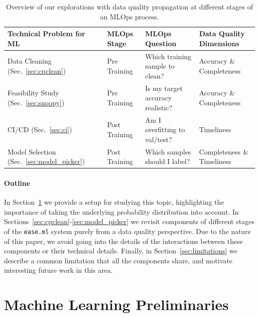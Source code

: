 \documentclass[11pt]{article}
\begin{document}
\begin{table}[t!]
\caption{Overview of 
our explorations with data quality propagation at different stages of an MLOps 
process.}
\label{tbl:overview}
\vspace{-0.5em}
\small
\centering
\begin{tabular}{@{}llll@{}}
\toprule
\textbf{Technical Problem for ML}                           & \textbf{MLOps Stage}         & \textbf{MLOps Question}                                   & \textbf{Data Quality Dimensions}        \\ \midrule
Data Cleaning (Sec.~\ref{sec:cpclean})~\cite{karlavs2020nearest}              & Pre Training  & Which training sample 
to clean?              &
Accuracy \& Completeness\\
Feasibility Study (Sec.~\ref{sec:snoopy})~\cite{renggli2020automatic}         & Pre Training  & Is my target accuracy realistic? & Accuracy \& Completeness\\
CI/CD (Sec.~\ref{sec:ci})~\cite{renggli2019continuous} & Post Training & 
Am I overfitting to val/test? & Timeliness\\
Model Selection (Sec.~\ref{sec:model_picker})~\cite{karimi2020online}        & Post Training & Which samples should I label?                        & Completeness \& Timeliness\\
\bottomrule
\end{tabular}
\end{table}

\vspace{-0.5em}
\paragraph*{Outline}
In Section~\ref{sec:ml} we provide a setup for studying this topic, highlighting the importance of taking the underlying probability distribution into account. In Sections~\ref{sec:cpclean}-\ref{sec:model_picker} we revisit components of different stages of the \texttt{ease.ml} system purely from a data quality perspective. Due to the nature of this paper, we avoid going into the details of the interactions between these components or
their technical details.
Finally, in Section~\ref{sec:limitations} we describe a common limitation that all the components share, and motivate interesting future work in this area.

\section{Machine Learning Preliminaries}
\label{sec:ml}
\end{document}
